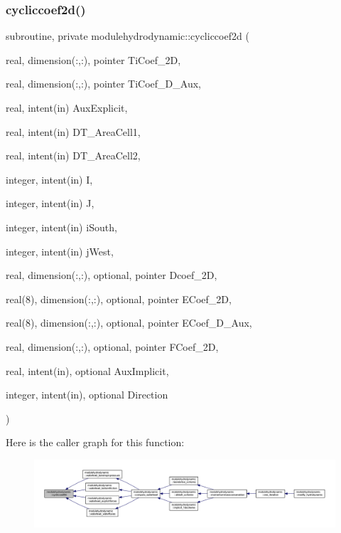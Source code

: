 \subsubsection{\texorpdfstring{cycliccoef2d()}{cycliccoef2d()}}
{\footnotesize\ttfamily subroutine, private modulehydrodynamic\+::cycliccoef2d (\begin{DoxyParamCaption}\item[{real, dimension(\+:,\+:), pointer}]{Ti\+Coef\+\_\+2D,  }\item[{real, dimension(\+:,\+:), pointer}]{Ti\+Coef\+\_\+D\+\_\+\+Aux,  }\item[{real, intent(in)}]{Aux\+Explicit,  }\item[{real, intent(in)}]{D\+T\+\_\+\+Area\+Cell1,  }\item[{real, intent(in)}]{D\+T\+\_\+\+Area\+Cell2,  }\item[{integer, intent(in)}]{I,  }\item[{integer, intent(in)}]{J,  }\item[{integer, intent(in)}]{i\+South,  }\item[{integer, intent(in)}]{j\+West,  }\item[{real, dimension(\+:,\+:), optional, pointer}]{Dcoef\+\_\+2D,  }\item[{real(8), dimension(\+:,\+:), optional, pointer}]{E\+Coef\+\_\+2D,  }\item[{real(8), dimension(\+:,\+:), optional, pointer}]{E\+Coef\+\_\+D\+\_\+\+Aux,  }\item[{real, dimension(\+:,\+:), optional, pointer}]{F\+Coef\+\_\+2D,  }\item[{real, intent(in), optional}]{Aux\+Implicit,  }\item[{integer, intent(in), optional}]{Direction }\end{DoxyParamCaption})\hspace{0.3cm}{\ttfamily [private]}}

Here is the caller graph for this function\+:\nopagebreak
\begin{figure}[H]
\begin{center}
\leavevmode
\includegraphics[width=350pt]{namespacemodulehydrodynamic_a51f796ba1d401f24370c5f9dd5ec71ae_icgraph}
\end{center}
\end{figure}
\mbox{\label{namespacemodulehydrodynamic_aabd13dda5e1f35caf879873becb922c4}} 
